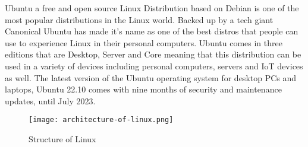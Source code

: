 \documentclass[conference]{IEEEtran}
\begin{document}
Ubuntu a free and open source Linux Distribution based on Debian is one of the most popular distributions in the Linux world. Backed up by a tech giant Canonical Ubuntu has made it's name as one of the best distros that people can use to experience Linux in their personal computers. Ubuntu comes in three editions that are Desktop, Server and Core meaning that this distribution can be used in a variety of devices including personal computers, servers and  IoT devices as well. The latest version of the Ubuntu operating system for desktop PCs and laptops, Ubuntu 22.10 comes with nine months of security and maintenance updates, until July 2023.

\begin{figure}[htbp]
\centerline{\texttt{[image: architecture-of-linux.png]}}
\caption{Structure of Linux}
\label{fig2}
\end{figure}
\end{document}

